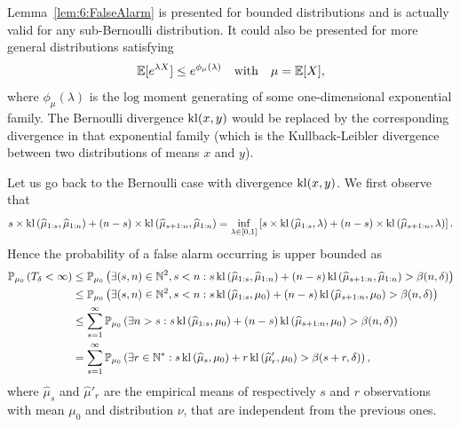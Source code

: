 \begin{smallproof}
Lemma~\ref{lem:6:FalseAlarm} is presented for bounded distributions and is actually valid for any sub-Bernoulli distribution. It could also be presented for more general distributions satisfying
\begin{equation}
    \mathbb{E}[e^{\lambda X} ] \leq e^{\phi_\mu(\lambda)} \ \ \text{ with } \ \ \mu=\mathbb{E}[X]\label{def:6:subExpo},
\end{equation}
where $\phi_\mu(\lambda)$ is the $\mathrm{log}$ moment generating of some one-dimensional exponential family. The Bernoulli divergence $\mathrm{kl}(x,y)$ would be replaced by the corresponding divergence in that exponential family (which is the Kullback-Leibler divergence between two distributions of means $x$ and $y$).

Let us go back to the Bernoulli case with divergence $\mathrm{kl}(x,y)$.
We first observe that
\[s \times \mathrm{kl}\left(\widehat{\mu}_{1:s},\widehat{\mu}_{1:n}\right) + (n-s) \times \mathrm{kl}\left(\widehat{\mu}_{s+1:n},\widehat{\mu}_{1:n}\right) = \inf_{\lambda \in [0,1]}\left[s \times \mathrm{kl}\left(\widehat{\mu}_{1:s},\lambda\right) + (n-s) \times \mathrm{kl}\left(\widehat{\mu}_{s+1:n},\lambda\right)\right].\]
Hence the probability of a false alarm occurring is upper bounded as
%
\begin{align*}
    \mathbb{P}_{\mu_0}\left(T_{\delta} < \infty\right) & \leq \mathbb{P}_{\mu_0}\left(\exists (s,n) \in \mathbb{N}^2, s < n:  s \, \mathrm{kl}\left(\widehat{\mu}_{1:s},\widehat{\mu}_{1:n}\right) + (n-s) \, \mathrm{kl}\left(\widehat{\mu}_{s+1:n},\widehat{\mu}_{1:n}\right) > \beta(n,\delta)\right)\\
    & \leq \mathbb{P}_{\mu_0}\left(\exists (s,n) \in \mathbb{N}^2, s < n:  s \, \mathrm{kl}\left(\widehat{\mu}_{1:s},\mu_0\right) + (n-s) \, \mathrm{kl}\left(\widehat{\mu}_{s+1:n},\mu_0\right) > \beta(n,\delta)\right) \\
    & \leq \sum_{s =1}^{\infty} \mathbb{P}_{\mu_0}\left(\exists n > s:  s \, \mathrm{kl}\left(\widehat{\mu}_{1:s},\mu_0\right) + (n-s) \, \mathrm{kl}\left(\widehat{\mu}_{s+1:n},\mu_0\right) > \beta(n,\delta)\right)\\
    & =   \sum_{s =1}^{\infty} \mathbb{P}_{\mu_0}\left(\exists r \in \mathbb{N}^*:  s \, \mathrm{kl}\left(\widehat{\mu}_{s},\mu_0\right) + r \, \mathrm{kl}\left(\widehat{\mu}'_{r},\mu_0\right) > \beta(s+r,\delta)\right),
\end{align*}
%
where $\widehat{\mu}_{s}$ and $\widehat{\mu}'_{r}$ are the empirical means of respectively $s$ and $r$ \iid{} observations with mean $\mu_0$ and distribution $\nu$, that are independent from the previous ones.

\end{smallproof}
